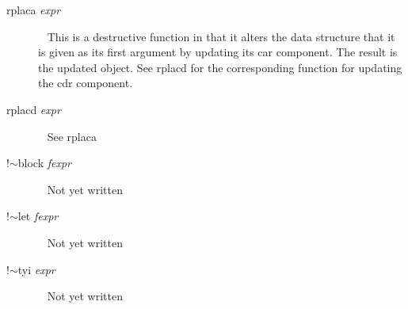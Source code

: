 \documentclass[a4paper,11pt]{article}
\begin{document}
\begin{description}
\item[{\ttfamily rplaca} {\itshape expr}] ~\newline
This is a destructive function in that it alters the data structure
that it is given as its first argument by updating its {\ttfamily car}
component. The result is the updated object. See {\ttfamily rplacd}
for the corresponding function for updating the {\ttfamily cdr} component.

\item [{\ttfamily rplacd} {\itshape expr}] ~\newline
See {\ttfamily rplaca}

\item [{\ttfamily !$\sim$block} {\itshape  fexpr}] ~\newline
Not yet written

\item [{\ttfamily !$\sim$let} {\itshape  fexpr}] ~\newline
Not yet written

\item [{\ttfamily !$\sim$tyi} {\itshape  expr}] ~\newline
Not yet written

\end{description}
\end{document}
